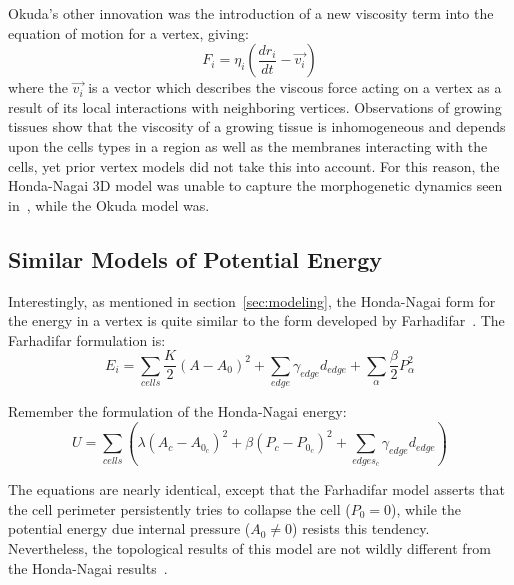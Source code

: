 Okuda's other innovation was the introduction of a new viscosity term into the equation of motion for a vertex, giving:
\begin{equation}
F_i = \eta_i(\frac{dr_i}{dt} - \vec{v_i})
\end{equation}
where the $\vec{v_i}$ is a vector which describes the viscous force acting on a vertex as a result of its local interactions with neighboring vertices. Observations of growing tissues show that the viscosity of a growing tissue is inhomogeneous and depends upon the cells types in a region as well as the membranes interacting with the cells, yet prior vertex models did not take this into account. For this reason, the Honda-Nagai 3D model was unable to capture the morphogenetic dynamics seen in~\cite{Mao}, while the Okuda model was.


\subsection{Similar Models of Potential Energy}
Interestingly, as mentioned in section~\ref{sec:modeling}, the Honda-Nagai form for the energy in a vertex is quite similar to the form developed by Farhadifar~\cite{Farhadifar}. The Farhadifar formulation is:
\begin{equation}
E_i = \sum\limits_{cells}\frac K2(A - A_0)^2 + \sum\limits_{edge}\gamma_{edge}d_{edge} + \sum\limits_{\alpha}\frac\beta2P_\alpha^2
\end{equation}

Remember the formulation of the Honda-Nagai energy:
\begin{equation*}
U = \sum\limits_{cells}\left(\lambda(A_c - A_{0_c})^2 + \beta(P_c - P_{0_c})^2 + \sum_{edges_c}\gamma_{edge}d_{edge}\right)
\end{equation*}

The equations are nearly identical, except that the Farhadifar model asserts that the cell perimeter persistently tries to collapse the cell ($P_0=0$), while the potential energy due internal pressure ($A_0\ne0$) resists this tendency. Nevertheless, the topological results of this model are not wildly different from the Honda-Nagai results~\cite{Farhadifar}.

